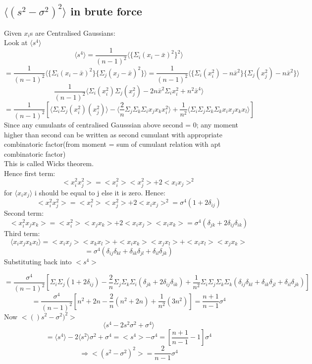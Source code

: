 \documentclass[11pt]{article}
\begin{document}
	\subsection{$\langle (s^2 -\sigma^2)^2\rangle$ in brute force}
	Given $x_i$s are Centralised Gaussians:\\
	Look at $\langle s^4 \rangle$
	\[
		\langle s^4 \rangle = \frac{1}{(n-1)^2}\langle \{\Sigma_i(x_i-\bar{x})^2\}^2\rangle 
	\]
	\[
		= \frac{1}{(n-1)^2}\langle \{\Sigma_i(x_i-\bar{x})^2\}\{\Sigma_j(x_j-\bar{x})^2\}\rangle  = \frac{1}{(n-1)^2}\langle \{\Sigma_i(x_i^2)-n\bar{x}^2\}\{\Sigma_j(x_j^2)-n\bar{x}^2\}\rangle
	\]
	\[
		\frac{1}{(n-1)^2}\langle \Sigma_i(x_i^2)\Sigma_j(x_j^2)- 2n\bar{x}^2\Sigma_i x_i^2 + n^2 \bar{x}^4\rangle
	\]
	\[
		= \frac{1}{(n-1)^2}[\langle \Sigma_i\Sigma_j(x_i^2)(x_j^2)\rangle - \langle \frac{2}{n}\Sigma_j\Sigma_k\Sigma_i x_j x_k x_i^2 \rangle + \frac{1}{n^2} \langle \Sigma_i\Sigma_j\Sigma_k\Sigma_k x_ix_jx_kx_l\rangle]
	\]
	Since any cumulants of centralised Gausssian above second = 0; any moment higher than second can be written as second cumulant with appropriate combinatoric factor(from moment = sum of cumulant relation with apt combinatoric factor)\\
	This is called Wicks theorem.\\
	Hence first term:
	\[
		<x_i^2 x_j^2> = <x_i^2><x_j^2> + 2<x_i x_j>^2  
	\]
	for $\langle x_i x_j \rangle$ i should be equal to j else it is zero.
	Hence:
	\[
		<x_i^2 x_j^2> = <x_i^2><x_j^2> + 2<x_i x_j>^2 = \sigma^4(1+2\delta_{ij})
	\]
	Second term:
	\[
		<x_i^2 x_j x_k> = <x_i^2><x_j x_k> + 2<x_i x_j><x_i x_k> = \sigma^4(\delta_{jk} + 2\delta_{ij}\delta_{ik})
	\]
	Third term:
	\[
		\langle x_ix_jx_kx_l\rangle = <x_ix_j><x_kx_l>+ <x_ix_k><x_jx_l> + <x_ix_l><x_jx_k> 
	\]
	\[
		= \sigma^4(\delta_{ij}\delta_{kl} + \delta_{ik}\delta_{jl} + \delta_{il}\delta_{jk})
	\]
	Substituting back into $<s^4>$
	
	\[
		=\frac{\sigma^4}{(n-1)^2}[\Sigma_i\Sigma_j(1+2\delta_{ij}) -  \frac{2}{n}\Sigma_j\Sigma_k\Sigma_i (\delta_{jk} + 2\delta_{ij}\delta_{ik}) + \frac{1}{n^2}  \Sigma_i\Sigma_j\Sigma_k\Sigma_k (\delta_{ij}\delta_{kl} + \delta_{ik}\delta_{jl} + \delta_{il}\delta_{jk})]
	\]
	\[
		= \frac{\sigma^4}{(n-1)^2}[n^2+2n -\frac{2}{n}(n^2+2n) + \frac{1}{n^2}(3n^2)] = \frac{n+1}{n-1}\sigma^4
	\]
	Now $<()s^2-\sigma^2)^2>$
	\[
		\langle s^4 -2s^2\sigma^2 +\sigma^4\rangle
	\]
	\[
		 = \langle s^4\rangle -2\langle s^2\rangle \sigma^2 + \sigma^4 = <s^4>-\sigma^4 =[\frac{n+1}{n-1}-1]\sigma^4
	\]
	\[
		\Rightarrow \boxed{<(s^2-\sigma^2)^2> =\frac{2}{n-1}\sigma^4 }	
	\]
	
\end{document}
